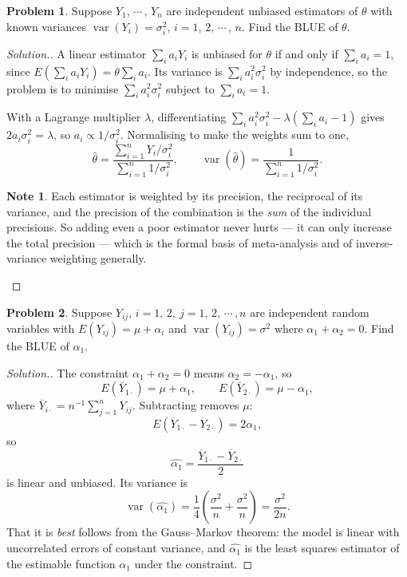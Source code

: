 \documentclass[12pt,a4paper]{report}
\theoremstyle{definition}
\newtheorem*{note}{Note}
\DeclareMathOperator{\var}{var}
\newtheorem{problemx}{Problem}[section]
\newenvironment{problem}{\begin{problemx}}{\end{problemx}}
\newenvironment{solution}
  {\renewcommand{\qedsymbol}{}\begin{proof}[\textit{Solution}.]}
  {\end{proof}}
\begin{document}
\begin{problem}
Suppose $Y_1, \, \cdots\, , \, Y_n$ are independent unbiased estimators of $\theta$ with known variances $\var (Y_i) = \sigma_i^2, \, i = 1, \, 2, \, \cdots\, , \, n$. Find the BLUE of $\theta$.
\end{problem}

\begin{solution}
A linear estimator $\sum_i a_iY_i$ is unbiased for $\theta$ if and only if
$\sum_i a_i = 1$, since $E\left(\sum_i a_iY_i\right)=\theta\sum_i a_i$. Its
variance is $\sum_i a_i^{2}\sigma_i^{2}$ by independence, so the problem is to
minimise $\sum_i a_i^{2}\sigma_i^{2}$ subject to $\sum_i a_i=1$.

With a Lagrange multiplier $\lambda$, differentiating
$\sum_i a_i^{2}\sigma_i^{2} - \lambda\left(\sum_i a_i - 1\right)$ gives
$2a_i\sigma_i^{2}=\lambda$, so $a_i \propto 1/\sigma_i^{2}$. Normalising to make
the weights sum to one,
\[\widehat{\theta} = \frac{\sum_{i=1}^{n} Y_i/\sigma_i^{2}}
{\sum_{i=1}^{n} 1/\sigma_i^{2}},
\qquad
\var\left(\widehat{\theta}\right) = \frac{1}{\sum_{i=1}^{n}1/\sigma_i^{2}} .\]

\begin{note}
Each estimator is weighted by its precision, the reciprocal of its variance, and
the precision of the combination is the \emph{sum} of the individual precisions.
So adding even a poor estimator never hurts --- it can only increase the total
precision --- which is the formal basis of meta-analysis and of inverse-variance
weighting generally.
\end{note}
\end{solution}

\begin{problem}
Suppose $Y_{ij}, \, i = 1, \, 2, \ j  = 1, \, 2, \, \cdots\, , n$ are independent random variables with $E(Y_{ij}) = \mu  + \alpha_i$ and $\var (Y_{ij}) = \sigma^2$ where $\alpha_1 + \alpha_2 = 0$. Find the BLUE of $\alpha_1$.
\end{problem}

\begin{solution}
The constraint $\alpha_1+\alpha_2=0$ means $\alpha_2=-\alpha_1$, so
\[E\left(\overline{Y}_{1\cdot}\right) = \mu+\alpha_1,\qquad
E\left(\overline{Y}_{2\cdot}\right) = \mu-\alpha_1 ,\]
where $\overline{Y}_{i\cdot}=n^{-1}\sum_{j=1}^{n}Y_{ij}$. Subtracting removes
$\mu$:
\[E\left(\overline{Y}_{1\cdot}-\overline{Y}_{2\cdot}\right) = 2\alpha_1 ,\]
so
\[\widehat{\alpha_1} = \frac{\overline{Y}_{1\cdot}-\overline{Y}_{2\cdot}}{2}\]
is linear and unbiased. Its variance is
\[\var\left(\widehat{\alpha_1}\right) = \frac{1}{4}\left(\frac{\sigma^{2}}{n}+\frac{\sigma^{2}}{n}\right)
= \frac{\sigma^{2}}{2n} .\]
That it is \emph{best} follows from the Gauss--Markov theorem: the model is
linear with uncorrelated errors of constant variance, and
$\widehat{\alpha_1}$ is the least squares estimator of the estimable function
$\alpha_1$ under the constraint.
\end{solution}
\end{document}
